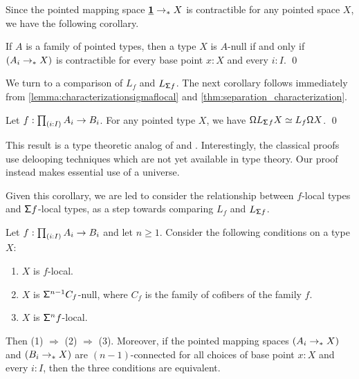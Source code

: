 Since the pointed mapping space $\underline{\mathbf{1}}\to_\ast X$ is contractible for any pointed space $X$, we have the following corollary.

\begin{cor}\label{cor:pointed_null}
If $A$ is a family of pointed types, then a type $X$ is $A$-null
if and only if $(A_i \to_{\ast} X)$ is contractible
for every base point $x : X$ and every $i : I$. \qed
\end{cor}

We turn to a comparison of $L_f$ and $L_{\mathsf{\Sigma} f}$.
The next corollary follows immediately from \cref{lemma:characterizationsigmaflocal}
and \cref{thm:separation_characterization}.

\begin{cor}\label{remark:commutativitylooplocalization}
    Let $f : \prd{i:I} A_i \to B_i$.
    For any pointed type $X$, we have
    $\mathsf{\Omega} L_{\mathsf{\Sigma}^{}{f}} X \simeq L_f \mathsf{\Omega} X$. \qed
\end{cor}

This result is a type theoretic analog of \cite[Theorem 3.1]{Bousfield} and \cite[3.A.1]{DrorFarjoun}.
Interestingly, the classical proofs use delooping techniques which are not yet available in type theory.
Our proof instead makes essential use of a universe.

Given this corollary, we are led to consider the relationship between $f$-local types and $\mathsf{\Sigma} f$-local types, as a step towards comparing $L_f$ and $L_{\mathsf{\Sigma} f}$.

\begin{thm}\label{theorem:characterizinglocalness}
    Let $f: \prd{i:I} A_i \to B_i$ and let $n \geq 1$.
    Consider the following conditions on a type $X$:
    \begin{enumerate}
    \item $X$ is $f$-local.
    \item $X$ is $\mathsf{\Sigma}^{n-1} C_f$-null,
    where $C_f$ is the family of cofibers of the family $f$. 
    \item $X$ is $\mathsf{\Sigma}^{n} f$-local.
    \end{enumerate}
    Then (1) $\Rightarrow$ (2) $\Rightarrow$ (3).
    Moreover, if the pointed mapping spaces $(A_i \to_{\ast} X)$ and $(B_i \to_{\ast} X)$
    are $(n-1)$-connected for all choices of base point $x : X$
    and every $i : I$,
    then the three conditions are equivalent.
\end{thm}

